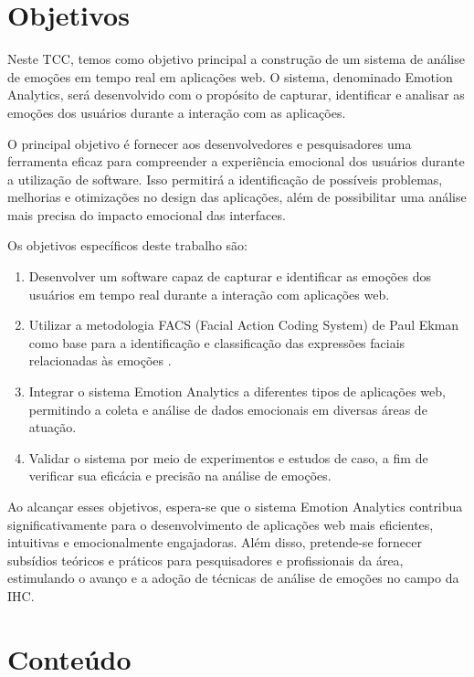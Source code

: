 \section {Objetivos}

Neste TCC, temos como objetivo principal a construção de um sistema de análise de emoções em tempo real em aplicações web. O sistema, denominado Emotion Analytics, será desenvolvido com o propósito de capturar, identificar e analisar as emoções dos usuários durante a interação com as aplicações.

O principal objetivo é fornecer aos desenvolvedores e pesquisadores uma ferramenta eficaz para compreender a experiência emocional dos usuários durante a utilização de software. Isso permitirá a identificação de possíveis problemas, melhorias e otimizações no design das aplicações, além de possibilitar uma análise mais precisa do impacto emocional das interfaces.

Os objetivos específicos deste trabalho são:

\begin{enumerate}
  \item Desenvolver um software capaz de capturar e identificar as emoções dos usuários em tempo real durante a interação com aplicações web.
  \item Utilizar a metodologia FACS (Facial Action Coding System) de Paul Ekman como base para a identificação e classificação das expressões faciais relacionadas às emoções \cite{5}.
  \item Integrar o sistema Emotion Analytics a diferentes tipos de aplicações web, permitindo a coleta e análise de dados emocionais em diversas áreas de atuação.
  \item Validar o sistema por meio de experimentos e estudos de caso, a fim de verificar sua eficácia e precisão na análise de emoções.
\end{enumerate}
  
Ao alcançar esses objetivos, espera-se que o sistema Emotion Analytics contribua significativamente para o desenvolvimento de aplicações web mais eficientes, intuitivas e emocionalmente engajadoras. Além disso, pretende-se fornecer subsídios teóricos e práticos para pesquisadores e profissionais da área, estimulando o avanço e a adoção de técnicas de análise de emoções no campo da IHC.

\section{Conteúdo}

